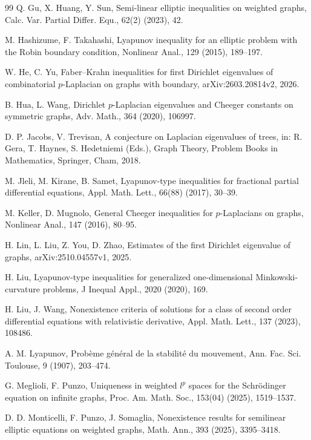 \documentclass[twoside,12pt,letter]{article}
\theoremstyle{plain}
\theoremstyle{definition}
\theoremstyle{remark}
\numberwithin{equation}{section}
\begin{document}
\begin{thebibliography}{99}
Q. Gu, X. Huang, Y. Sun, 
Semi-linear elliptic inequalities on weighted graphs,
Calc. Var. Partial Differ. Equ.,
62(2) (2023), 42.




M. Hashizume,  F. Takahashi, 
Lyapunov inequality for an elliptic problem with the Robin boundary condition, 
Nonlinear Anal.,
 129 (2015), 189--197.

W. He, C. Yu,
Faber--Krahn inequalities for first Dirichlet eigenvalues of combinatorial
\(p\)-Laplacian on graphs with boundary,
arXiv:2603.20814v2,
2026.

B. Hua, L. Wang,
Dirichlet \(p\)-Laplacian eigenvalues and Cheeger constants on symmetric graphs,
Adv. Math.,
364 (2020), 106997.

D. P. Jacobs, V. Trevisan,
A conjecture on Laplacian eigenvalues of trees,
in: R. Gera, T. Haynes, S. Hedetniemi (Eds.),
Graph Theory,
Problem Books in Mathematics,
Springer, Cham,
2018.

M. Jleli, M. Kirane,  B. Samet, 
Lyapunov-type inequalities for fractional partial differential equations, 
Appl. Math. Lett.,
66(88) (2017), 30--39.


M. Keller, D. Mugnolo,
General Cheeger inequalities for \(p\)-Laplacians on graphs,
Nonlinear Anal.,
147 (2016), 80--95.

H. Lin, L. Liu, Z. You, D. Zhao,
Estimates of the first Dirichlet eigenvalue of graphs,
arXiv:2510.04557v1,
2025.

H. Liu,  
Lyapunov-type inequalities for generalized one-dimensional Minkowski-curvature problems,
 J Inequal Appl., 
 2020 (2020), 169. 
 

H. Liu,  J. Wang, 
Nonexistence criteria of solutions for a class of second order differential equations with relativistic derivative,
Appl. Math. Lett.,
137 (2023), 108486.



A. M. Lyapunov, 
Prob\`eme g\'en\'eral de la stabilit\'e du mouvement,
Ann. Fac. Sci. Toulouse,  9 (1907), 203--474.


G. Meglioli,  F. Punzo,  
Uniqueness in weighted \(l^p\) spaces for the Schr\"odinger equation on infinite graphs,
Proc. Am. Math. Soc.,  
153(04) (2025), 1519--1537.


D. D. Monticelli, F. Punzo, J. Somaglia,
Nonexistence results for semilinear elliptic equations on weighted graphs,
Math. Ann.,
393 (2025), 3395--3418.







\end{thebibliography}
\end{document}
